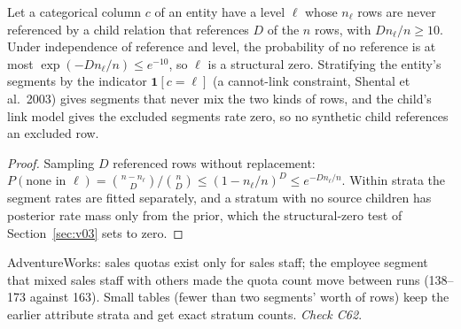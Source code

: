 \begin{proposition}\label{prop:cannotlink}
Let a categorical column $c$ of an entity have a level $\ell$ whose $n_\ell$ rows are never referenced by a child relation that references $D$ of the $n$ rows, with $D n_\ell/n\ge10$. Under independence of reference and level, the probability of no reference is at most $\exp(-Dn_\ell/n)\le e^{-10}$, so $\ell$ is a structural zero. Stratifying the entity's segments by the indicator $\mathbf 1[c=\ell]$ (a cannot-link constraint, Shental et al.\ 2003) gives segments that never mix the two kinds of rows, and the child's link model gives the excluded segments rate zero, so no synthetic child references an excluded row.
\end{proposition}
\begin{proof}
Sampling $D$ referenced rows without replacement: $P(\text{none in }\ell)=\binom{n-n_\ell}{D}/\binom nD\le(1-n_\ell/n)^D\le e^{-Dn_\ell/n}$. Within strata the segment rates are fitted separately, and a stratum with no source children has posterior rate mass only from the prior, which the structural-zero test of Section~\ref{sec:v03} sets to zero.
\end{proof}
\noindent AdventureWorks: sales quotas exist only for sales staff; the employee segment that mixed sales staff with others made the quota count move between runs (138--173 against 163). Small tables (fewer than two segments' worth of rows) keep the earlier attribute strata and get exact stratum counts. \emph{Check C62}.


